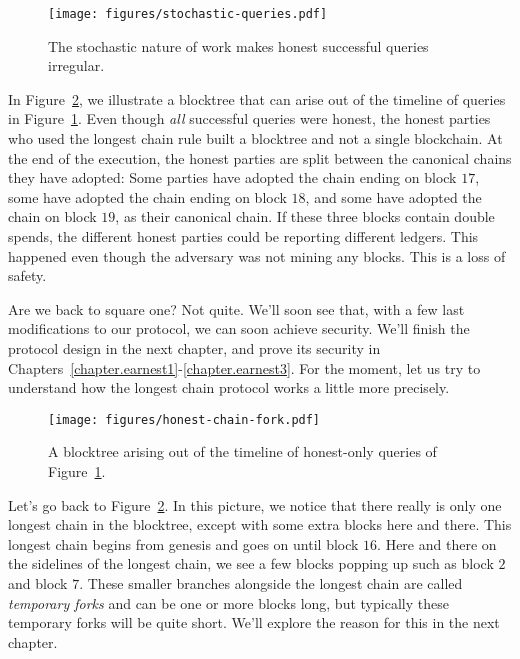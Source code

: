 \begin{figure}[h]
    \centering
    \texttt{[image: figures/stochastic-queries.pdf]}
    \caption{The stochastic nature of work makes honest successful queries irregular.}
    \label{fig.stochastic-queries}
\end{figure}

In Figure~\ref{fig.honest-chain-fork}, we illustrate a
blocktree that can arise out of the timeline of queries in Figure~\ref{fig.stochastic-queries}.
Even though \emph{all} successful queries were honest, the honest parties who used the longest
chain rule built a blocktree and not a single blockchain. At the end of the execution, the honest
parties are split between the canonical chains they have adopted: Some parties have adopted
the chain ending on block $17$, some have adopted the chain ending on block $18$, and some have
adopted the chain on block $19$, as their canonical chain. If these three blocks contain double
spends, the different honest parties could be reporting different ledgers. This happened even
though the adversary was not mining any blocks. This is a loss of safety.

Are we back to square one? Not quite. We'll soon see that, with a few last modifications to
our protocol, we can soon achieve security. We'll finish the protocol design in the next chapter,
and prove its security in Chapters~\ref{chapter.earnest1}-\ref{chapter.earnest3}. For the moment,
let us try to understand how the longest chain protocol works a little more precisely.

\begin{figure}[h]
    \centering
    \texttt{[image: figures/honest-chain-fork.pdf]}
    \caption{A blocktree arising out of the timeline of honest-only queries of Figure~\ref{fig.stochastic-queries}.}
    \label{fig.honest-chain-fork}
\end{figure}

Let's go back to Figure~\ref{fig.honest-chain-fork}. In this picture, we notice that there
really is only one longest chain in the blocktree, except with some extra blocks here and
there. This longest chain begins from genesis and goes on until block $16$. Here and there
on the sidelines of the longest chain, we see a few blocks popping up such as block $2$
and block $7$. These smaller branches alongside the longest chain are called \emph{temporary
forks} and can be one or more blocks long, but typically these
temporary forks will be quite short. We'll explore the reason for this in the next chapter.

